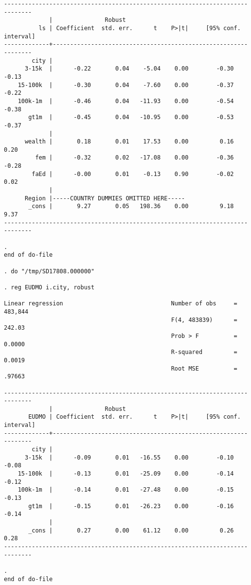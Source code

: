 \documentclass[11pt, letterpaper]{article}
\begin{document}
\begin{spacing}{1.9}
\begin{spacing}{.5}
\begin{scriptsize}
\begin{verbatim}
------------------------------------------------------------------------------
             |               Robust
          ls | Coefficient  std. err.      t    P>|t|     [95% conf. interval]
-------------+----------------------------------------------------------------
        city |
      3-15k  |      -0.22       0.04    -5.04    0.00        -0.30       -0.13
    15-100k  |      -0.30       0.04    -7.60    0.00        -0.37       -0.22
    100k-1m  |      -0.46       0.04   -11.93    0.00        -0.54       -0.38
       gt1m  |      -0.45       0.04   -10.95    0.00        -0.53       -0.37
             |
      wealth |       0.18       0.01    17.53    0.00         0.16        0.20
         fem |      -0.32       0.02   -17.08    0.00        -0.36       -0.28
        faEd |      -0.00       0.01    -0.13    0.90        -0.02        0.02
             |
      Region |-----COUNTRY DUMMIES OMITTED HERE-----
       _cons |       9.27       0.05   198.36    0.00         9.18        9.37
------------------------------------------------------------------------------

. 
end of do-file

. do "/tmp/SD17808.000000"

. reg EUDMO i.city, robust  

Linear regression                               Number of obs     =    483,844
                                                F(4, 483839)      =     242.03
                                                Prob > F          =     0.0000
                                                R-squared         =     0.0019
                                                Root MSE          =     .97663

------------------------------------------------------------------------------
             |               Robust
       EUDMO | Coefficient  std. err.      t    P>|t|     [95% conf. interval]
-------------+----------------------------------------------------------------
        city |
      3-15k  |      -0.09       0.01   -16.55    0.00        -0.10       -0.08
    15-100k  |      -0.13       0.01   -25.09    0.00        -0.14       -0.12
    100k-1m  |      -0.14       0.01   -27.48    0.00        -0.15       -0.13
       gt1m  |      -0.15       0.01   -26.23    0.00        -0.16       -0.14
             |
       _cons |       0.27       0.00    61.12    0.00         0.26        0.28
------------------------------------------------------------------------------

. 
end of do-file


\end{verbatim}
\end{scriptsize}
\end{spacing}
\end{spacing}
\end{document}
